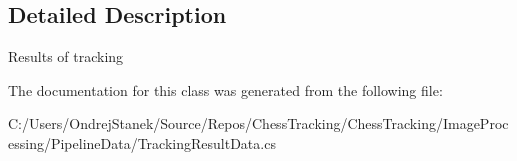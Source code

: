 \subsection{Detailed Description}
Results of tracking 



The documentation for this class was generated from the following file\+:\begin{DoxyCompactItemize}
\item 
C\+:/\+Users/\+Ondrej\+Stanek/\+Source/\+Repos/\+Chess\+Tracking/\+Chess\+Tracking/\+Image\+Processing/\+Pipeline\+Data/Tracking\+Result\+Data.\+cs\end{DoxyCompactItemize}
